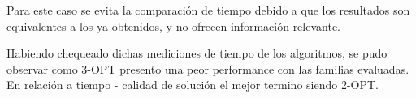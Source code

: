   Para este caso se evita la comparación de tiempo debido a que los resultados son equivalentes a los ya obtenidos, y no ofrecen información relevante.
  

Habiendo chequeado dichas mediciones de tiempo de los algoritmos, se pudo observar como 3-OPT presento una peor performance con las familias evaluadas. En relaci\'on a tiempo - calidad de soluci\'on el mejor termino siendo 2-OPT.